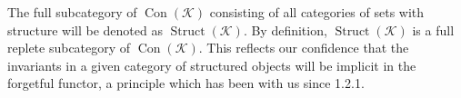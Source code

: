 The full subcategory of $\operatorname{Con}(\mathcal{K})$ consisting of all categories of sets with structure will be denoted as $\operatorname{Struct}(\mathcal{K})$. By definition, $\operatorname{Struct}(\mathcal{K})$ is a full replete subcategory of $\operatorname{Con}(\mathcal{K})$. This reflects our confidence that the invariants in a given category of structured objects will be implicit in the forgetful functor, a principle which has been with us since 1.2.1.
